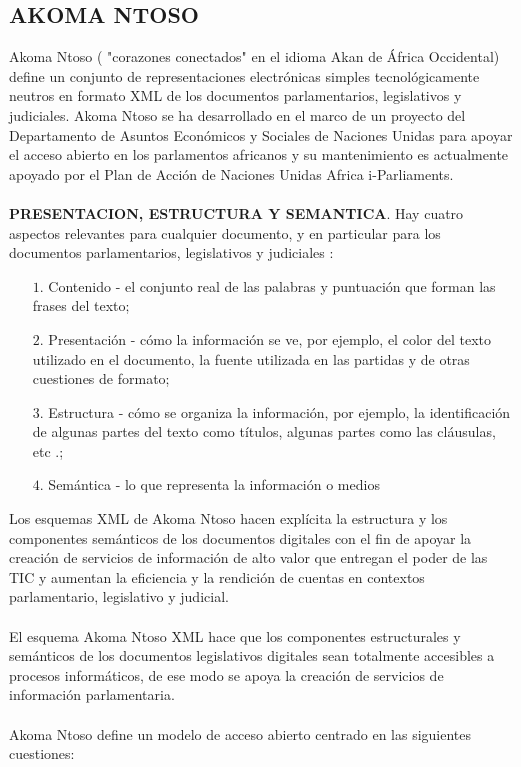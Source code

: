 \documentclass[conference]{IEEEtran}\usepackage[]{graphicx}\usepackage[]{color}
\begin{document}
\subsection{AKOMA NTOSO}  
Akoma Ntoso ( "corazones conectados" en el idioma Akan de África Occidental) define un conjunto de representaciones electrónicas simples tecnológicamente neutros en formato XML de los documentos parlamentarios, legislativos y judiciales.  Akoma Ntoso se ha desarrollado en el marco de un proyecto del Departamento de Asuntos Económicos y Sociales de Naciones Unidas para apoyar el acceso abierto en los parlamentos africanos y su mantenimiento es actualmente apoyado por el Plan de Acción de Naciones Unidas Africa i-Parliaments. \\ \\
\textbf{PRESENTACION, ESTRUCTURA Y SEMANTICA}. Hay cuatro aspectos relevantes para cualquier documento, y en particular para los documentos parlamentarios, legislativos y judiciales \cite{biblio3}:
\begin{itemize}   
	\item[$1.$]	Contenido - el conjunto real de las palabras y puntuación que forman las frases del texto;
	\item[$2.$]	Presentación - cómo la información se ve, por ejemplo, el color del texto utilizado en el documento, la fuente utilizada en las partidas y de otras cuestiones de formato;
	\item[$3.$]	Estructura - cómo se organiza la información, por ejemplo, la identificación de algunas partes del texto como títulos, algunas partes como las cláusulas, etc .;
	\item[$4.$]	Semántica - lo que representa la información o medios
\end{itemize}   
Los esquemas XML de Akoma Ntoso hacen explícita la estructura y los componentes semánticos de los documentos digitales con el fin de apoyar la creación de servicios de información de alto valor que entregan el poder de las TIC y aumentan la eficiencia y la rendición de cuentas en contextos parlamentario, legislativo y judicial.\\ \\
El esquema Akoma Ntoso XML hace que los componentes estructurales y semánticos de los documentos legislativos digitales sean totalmente accesibles a procesos informáticos, de ese modo se apoya la creación de servicios de información parlamentaria. \\ \\
Akoma Ntoso define un modelo de acceso abierto centrado en las siguientes cuestiones:
\end{document}
